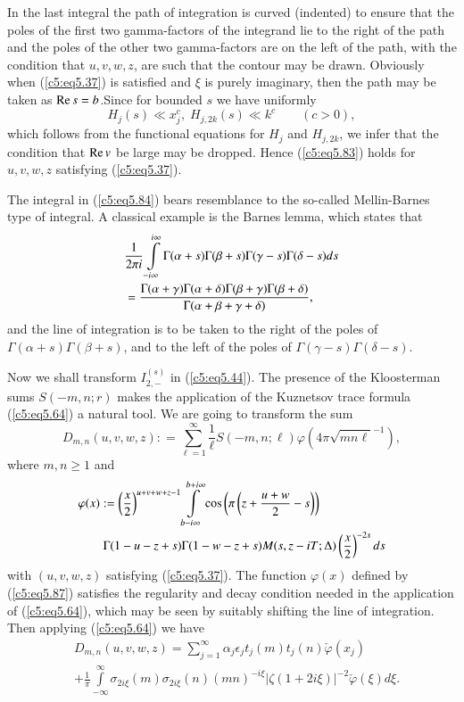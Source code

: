 In the last integral the path of integration is curved (indented) to
ensure that the poles of the first two gamma-factors of the integrand
lie to the right of the path and the poles of the other two
gamma-factors are on the left of the path, with the condition that
$u,v,w,z$, are such that the contour may be drawn. Obviously when
(\ref{c5:eq5.37}) is satisfied and $\xi$ is purely imaginary, then the
path may be taken as $\operatorname{Re}  s= b$.\pageoriginale Since for bounded $s$
we have uniformly 
\begin{equation}
H_j(s) \ll x^c_j, \; H_{j, 2k } (s) \ll k^c \qquad
(c>0),\label{c5:eq5.85} 
\end{equation}
which follows from the functional equations for $H_j$ and $H_{j,2k}$,
we infer that the condition that $\operatorname{Re} v$ be large may be
dropped. Hence (\ref{c5:eq5.83}) holds for $u,v,w,z$ satisfying
(\ref{c5:eq5.37}). 

The integral in (\ref{c5:eq5.84}) bears resemblance to the so-called
Mellin-Barnes type of integral. A classical example is the Barnes
lemma, which states that 
\begin{align}
& \frac{1}{2\pi i} \int\limits^{i\infty}_{-i\infty} \Gamma (\alpha+s)
  \Gamma (\beta +s) \Gamma (\gamma -s) \Gamma (\delta -s)
  ds\label{c5:eq5.86}\\ 
& = \frac{\Gamma (\alpha + \gamma) \Gamma (\alpha+ \delta) \Gamma
    (\beta+ \gamma) \Gamma (\beta + \delta)}{\Gamma(\alpha+ \beta +
    \gamma + \delta)},\notag 
\end{align}
and the line of integration is to be taken to the right of the poles
of $\Gamma (\alpha+s) \Gamma (\beta +s)$, and to the left of the poles
of $\Gamma (\gamma-s) \Gamma (\delta- s)$.  

Now we shall transform $I^{(s)}_{2,-}$ in (\ref{c5:eq5.44}). The
presence of the Kloosterman sums $S(-m,n;r)$ makes the application of
the Kuznetsov trace formula (\ref{c5:eq5.64}) a natural tool. We are
going to transform the sum 
$$
D_{m,n} (u,v,w,z) : = \sum\limits^\infty_{\ell=1} \frac{1}{\ell} S
(-m, n ;\ell) \varphi \left(4 \pi \sqrt{mn\ell}^{-1}\right), 
$$
where $m,n \geq 1$ and 
\begin{align}
& \varphi(x) : = 
\left(\frac{x}{2} \right)^{u+v+w+z-1} \int\limits^{b+i\infty}_{b-i\infty} \cos \left(\pi \left(z+\frac{u+w}{2} -s \right) \right)\label{c5:eq5.87} \\
& \qquad \Gamma (1-u-z+s) \Gamma (1-w-z+s) M (s, z - iT;\Delta)
\left(\frac{x}{2} \right)^{-2s} ds\notag  
\end{align}
with $(u,v,w,z)$ satisfying (\ref{c5:eq5.37}). The function
$\varphi(x)$ defined by (\ref{c5:eq5.87}) satisfies the regularity and
decay condition needed in the application of (\ref{c5:eq5.64}), which
may be seen by suitably shifting the line of integration. Then
applying (\ref{c5:eq5.64}) we have 
\begin{align*}
& D_{m,n} (u,v,w,z) = \sum\limits^\infty_{j=1} \alpha_j \epsilon_j t_j
  (m) t_j (n) \check{\varphi} (x_j)\\ 
& + \frac{1}{\pi} \int\limits^\infty_{-\infty} \sigma_{2i\xi} (m)
  \sigma_{2i\xi} (n) (mn)^{-i\xi} |\zeta(1+ 2i \xi)|^{-2}
  \check{\varphi} (\xi) d \xi.  
\end{align*}\pageoriginale

